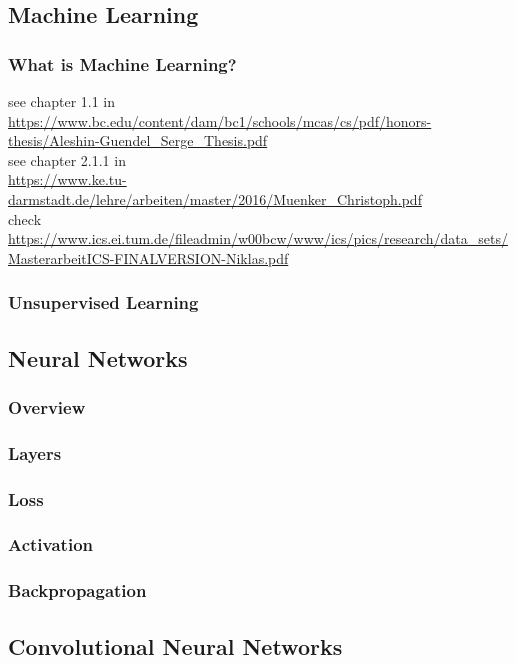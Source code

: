 \documentclass[../Main.tex]{subfiles}
\begin{document}
\subsection{Machine Learning} 
    \subsubsection{What is Machine Learning?}
    see chapter 1.1 in \\
    \url{https://www.bc.edu/content/dam/bc1/schools/mcas/cs/pdf/honors-thesis/Aleshin-Guendel_Serge_Thesis.pdf} \\
    see chapter 2.1.1 in \\
    \url{https://www.ke.tu-darmstadt.de/lehre/arbeiten/master/2016/Muenker_Christoph.pdf} \\
    check \\
    \url{https://www.ics.ei.tum.de/fileadmin/w00bcw/www/ics/pics/research/data_sets/MasterarbeitICS-FINALVERSION-Niklas.pdf}\\

\subsubsection{Unsupervised Learning}


\subsection{Neural Networks}
    \subsubsection{Overview}
    \subsubsection{Layers}
    \subsubsection{Loss}
    \subsubsection{Activation}
    \subsubsection{Backpropagation}
    

\subsection{Convolutional Neural Networks}
\end{document}

